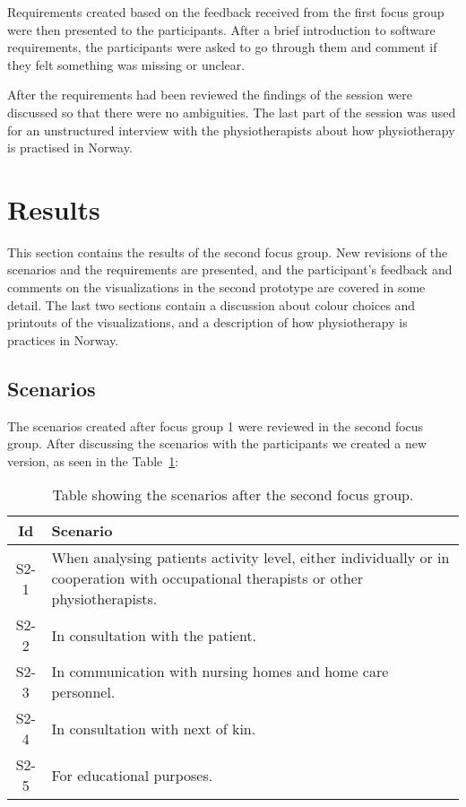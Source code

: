 Requirements created based on the feedback received from the first focus group were then presented to the participants. After a brief introduction to software requirements, the participants were asked to go through them and comment if they felt something was missing or unclear.

After the requirements had been reviewed the findings of the session were discussed so that there were no ambiguities. The last part of the session was used for an unstructured interview with the physiotherapists about how physiotherapy is practised in Norway. 

\section{Results}
This section contains the results of the second focus group. New revisions of the scenarios and the requirements are presented, and the participant's feedback and comments on the visualizations in the second prototype are covered in some detail. The last two sections contain a discussion about colour choices and printouts of the visualizations, and a description of how physiotherapy is practices in Norway.

\subsection{Scenarios}
The scenarios created after focus group 1 were reviewed in the second focus group. After discussing the scenarios with the participants we created a new version, as seen in the Table~\ref{tab:scen2}:

\begin{table}[h!]
  \centering
  \begin{tabular}{|c|p{9cm}|}
    \hline
    \textbf{Id} & \textbf{Scenario} \\ \hline
    S2-1 & When analysing patients activity level, either individually or in cooperation with occupational therapists or other physiotherapists. \\ \hline
    S2-2 & In consultation with the patient. \\ \hline
    S2-3 & In communication with nursing homes and home care personnel. \\ \hline
    S2-4 & In consultation with next of kin. \\ \hline
    S2-5 & For educational purposes. \\ \hline
  \end{tabular}
  \caption[Scenarios after the second focus group]{Table showing the scenarios after the second focus group.}
  \label{tab:scen2}
\end{table}

